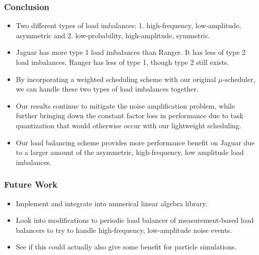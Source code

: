 \begin{frame}[Conclusion]
\frametitle{Conclusion}
\begin{itemize}

\item \small  Two different types of load imbalances: 1.  high-frequency,
  low-amplitude, asymmetric and 2. low-probability,
  high-amplitude, symmetric.


\item \small Jaguar has more type 1 load imbalances than Ranger. It has
  less of type 2 load imbalances.  Ranger has less of type 1, 
  though type 2 still exists. \\

\item \small By incorporating a weighted scheduling scheme with 
our original $\mu$-scheduler, we can handle these two types of load imbalances
  together. \\

\item \small Our results continue to mitigate the noise amplification
  problem, while further bringing down the constant factor loss in
  performance due to task quantization that would otherwise occur with 
our lightweight scheduling. \\
 
\item \small Our load balancing scheme provides more performance benefit
on Jaguar due to a larger amount of the asymmetric, high-frequency,
low amplitude load imbalances. \\ 

\end{itemize}
\end{frame}

\begin{frame}   
\frametitle{Future Work} 
\begin{itemize}
\item Implement and integrate into numerical linear algebra library. 
\item Look into modifications to periodic load balancer
of measurement-based load balancers 
to try to handle high-frequency, low-amplitude noise events. 
\item See if this could actually also give
some benefit for particle simulations. 
\end{itemize}
\end{frame}

